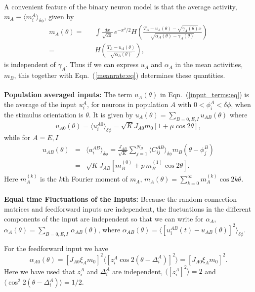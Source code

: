 A convenient feature of the binary neuron model is that the average activity,
$m_A\equiv\langle m_i^A\rangle_{\delta\phi}$, given by
\begin{eqnarray}
m_A(\theta)=&&\int\!\frac{dx}{\sqrt{2\pi}}\,e^{-x^2/2}
H\left(\frac{T_A-u_A(\theta)-\sqrt{\gamma_A(\theta)}x}
{ \sqrt{\alpha_A(\theta)-\gamma_A(\theta)}}\right) \nonumber \\
=&& H\left(\frac{T_A-u_A(\theta)}{\sqrt{\alpha_A(\theta)}}\right),
\label{meanrate:eq}
\end{eqnarray}
is independent of $\gamma_A$\@. Thus if we can express $u_A$ and $\alpha_A$ in 
the mean activities, $m_B$, this together with Eqn.~(\ref{meanrate:eq}) 
determines these quantities.\\
 \\
{\bf Population averaged inputs:}
The term $u_A(\theta)$ in Eqn.~(\ref{input_terms:eq}) is the average 
of the input $u_i^A$, for neurons 
in population $A$ with $0<\phi_i^A<\delta \phi$, when the stimulus orientation is $\theta$.
It is given by 
$u_A(\theta)=\sum_{B=0,E,I}u_{AB}(\theta)$ where
\begin{equation}
u_{A0}(\theta)=\langle u_i^{A0}\rangle_{\delta\phi}= 
\sqrt{K}J_{A0}m_0[1+\mu\cos 2\theta],
\label{uA0:eq}
\end{equation}
while for $A=E,I$
\begin{eqnarray}
u_{AB}(\theta) & = & \langle u_i^{AB}\rangle_{\delta\phi}  =  \frac{J_{AB}}{\sqrt{K}} \sum_{j=1}^{N_B}
\langle C_{ij}^{AB}\rangle_{\delta\phi}m_B(\theta-\phi_j^B)
\nonumber \\
& = & \sqrt{K}J_{AB}\left[ m_B^{(0)}+p\,m_B^{(1)}\cos 2\theta\right].
\label{uAB:eq}
\end{eqnarray}
Here $m_A^{(k)}$ is the $k$th Fourier moment of $m_A$, $m_A(\theta)=
\sum_{k=0}^\infty m_A^{(k)}\cos 2k\theta$\@.\\
 \\
{\bf Equal time Fluctuations of the Inputs:}
Because the random connection matrices and feedforward inputs 
are independent, the fluctuations in the different components of the 
input are independent so that we can write for $\alpha_A$,
$\alpha_A(\theta)=\sum_{B=0,E,I}\,\alpha_{AB}(\theta)$,
where $\alpha_{AB}(\theta)=
\langle [u_i^{AB}(t)-u_{AB}(\theta)]^2\rangle_{\delta\phi}$\@.

For the feedforward input we have
\begin{equation}  
\alpha_{A0}(\theta) = [J_{A0}\xi_A m_0]^2
\langle[z_i^A\cos 2(\theta-\Delta_i^A)]^2\rangle
= [J_{A0}\xi_A m_0]^2.
\label{alA0:eq}
\end{equation}
Here we have used that $z_i^A$ and $\Delta_i^A$ are independent, 
$\langle [z_i^A]^2\rangle=2$ and $\langle \cos^2 2(\theta-\Delta_i^A)\rangle=1/2$\@.

